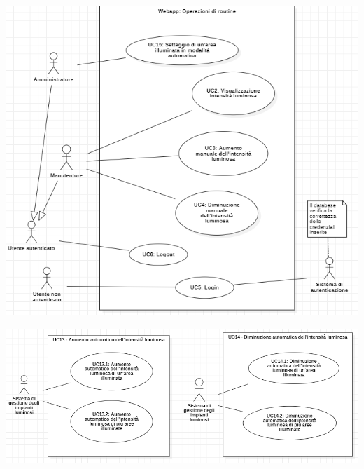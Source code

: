 \documentclass[a4paper, 12pt]{article}
\begin{document}
\includegraphics[scale=0.8]{diagramma_use_case_2.png}

\includegraphics[scale=0.65]{diagramma_use_case_3e4.png}
\end{document}
